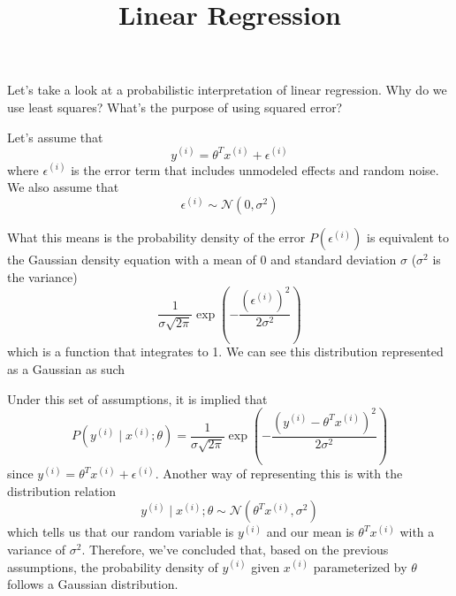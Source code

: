 \documentclass[11pt]{article}
\title{Linear Regression}
\author{}
\date{}
\begin{document}
\maketitle
\vspace{-1.2em}
Let's take a look at a probabilistic interpretation of linear regression. Why do we use least squares? What's the purpose of using squared error?

Let's assume that $$y^{(i)} = \theta^T x^{(i)} + \epsilon^{(i)}$$ where $\epsilon^{(i)}$ is the error term that includes unmodeled effects and random noise. We also assume that $$\epsilon^{(i)} \sim \mathcal{N} \left(0, \sigma^2 \right)$$

What this means is the probability density of the error $P\left(\epsilon^{(i)}\right)$ is equivalent to the Gaussian density equation with a mean of 0 and standard deviation $\sigma$ ($\sigma^2$ is the variance)
$$\frac{1}{\sigma \sqrt{2\pi}} \exp{\left(-\frac{\left(\epsilon^{(i)}\right)^2}{2\sigma^2}\right)}$$ which is a function that integrates to 1. We can see this distribution represented as a Gaussian as such
\begin{center}
\end{center}
Under this set of assumptions, it is implied that
$$P\left(y^{(i)}\mid x^{(i)};\theta\right) = \frac{1}{\sigma \sqrt{2\pi}} \exp{\left(-\frac{\left(y^{(i)} - \theta^T x^{(i)}\right)^2}{2\sigma^2}\right)}$$
since $y^{(i)} = \theta^T x^{(i)} + \epsilon^{(i)}$. Another way of representing this is with the distribution relation
$$y^{(i)}\mid x^{(i)};\theta \sim \mathcal{N} \left(\theta^T x^{(i)}, \sigma^2\right)$$
which tells us that our random variable is $y^{(i)}$ and our mean is $\theta^T x^{(i)}$ with a variance of $\sigma^2$. Therefore, we've concluded that, based on the previous assumptions, the probability density of $y^{(i)}$ given $x^{(i)}$ parameterized by $\theta$ follows a Gaussian distribution. \hfill \\
\vspace{0em} \\
\end{document}
